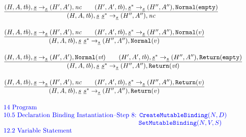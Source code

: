 \documentclass[a4paper, leqno]{amsart}
\newcommand{\rulesep}{\quad\quad}
\newcommand{\stmt}{s}
\newcommand{\ir}[1]{\ensuremath{\underline{#1}}}
\def\inred{\color{red}}
\def\inblue{\color{blue}}
\newcommand{\tb}{\emph{tb}}
\newcommand{\vorempty}{\emph{vt}}
\newcommand{\nc}{\emph{nc}}
\newcommand{\void}{{\tt Normal}({\tt empty})}
\newcommand{\state}{\ensuremath{(H,A,\tb)}}
\newcommand{\statep}{\ensuremath{(H',A',\tb)}}
\newcommand{\resp}{\ensuremath{(H',A')}}
\newcommand{\respp}{\ensuremath{(H'',A'')}}
\def\inred{\color{red}}
\def\inblue{\color{blue}}
\begin{document}
\[\begin{array}{l@{~~}l@{~~}ll}
\frac{\begin{matrix}
\state,\ir\stmt \rightarrow_{\ir\stmt} \resp,\nc
\rulesep
\statep,\ir{\stmt}^* \rightarrow_{\ir\stmt} \respp,\void
\end{matrix}}{\begin{matrix}
\state,\ir\stmt\ \ir\stmt^* \rightarrow_{\ir{\stmt}} \respp,\nc
\end{matrix}}\\[2em]

\frac{\begin{matrix}
\state,\ir\stmt \rightarrow_{\ir\stmt} \resp,\nc
\rulesep
\statep,\ir\stmt^* \rightarrow_{\ir\stmt} \respp,{\tt Normal}(v)
\end{matrix}}{\begin{matrix}
\state,\ir\stmt\ \ir\stmt^* \rightarrow_{\ir{\stmt}} \respp,{\tt Normal}(v)
\end{matrix}}\\[2em]

\frac{\begin{matrix}
\state,\ir\stmt \rightarrow_{\ir\stmt} \resp,{\tt Normal}(\vorempty)
\rulesep
\statep,\ir{\stmt}^* \rightarrow_{\ir\stmt} \respp,{\tt Return}({\tt empty})
\end{matrix}}{\begin{matrix}
\state,\ir\stmt\ \ir\stmt^* \rightarrow_{\ir{\stmt}} \respp,{\tt Return}(\vorempty)
\end{matrix}}\\[2em]

\frac{\begin{matrix}
\state,\ir\stmt \rightarrow_{\ir\stmt} \resp,\nc
\rulesep
\statep,\ir\stmt^* \rightarrow_{\ir\stmt} \respp,{\tt Return}(v)
\end{matrix}}{\begin{matrix}
\state,\ir\stmt\ \ir\stmt^* \rightarrow_{\ir{\stmt}} \respp,{\tt Return}(v)
\end{matrix}}\\[2em]

\mbox{\inblue 14 Program}\\
\mbox{\inblue 10.5 Declaration Binding Instantiation--Step 8:
${\tt CreateMutableBinding}(N,D)$}\\
\mbox{\inblue \phantom{10.5 Declaration Binding Instantiation--Step 8:}
${\tt SetMutableBinding}(N,V,S)$}\\
\mbox{\inblue 12.2 Variable Statement}\\


\end{array}\]
\end{document}
